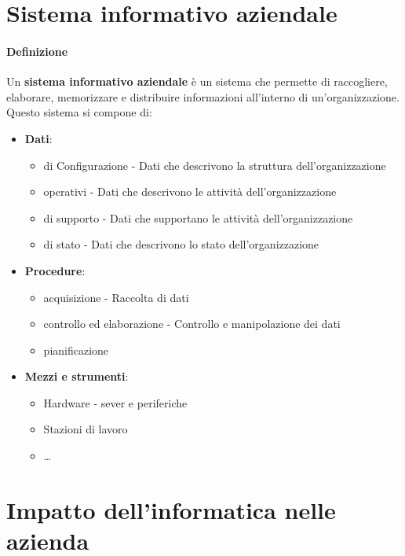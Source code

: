 \section{Sistema informativo aziendale}
    \paragraph{Definizione} Un \textbf{sistema informativo aziendale} è un sistema che permette di raccogliere, elaborare, memorizzare e distribuire informazioni all'interno di un'organizzazione. Questo sistema si compone di:
    \begin{itemize}
        \item \textbf{Dati}: \begin{itemize}
            \item di Configurazione - Dati che descrivono la struttura dell'organizzazione
            \item operativi - Dati che descrivono le attività dell'organizzazione
            \item di supporto - Dati che supportano le attività dell'organizzazione
            \item di stato - Dati che descrivono lo stato dell'organizzazione
        \end{itemize}
        \item \textbf{Procedure}: \begin{itemize}
            \item acquisizione - Raccolta di dati
            \item controllo ed elaborazione - Controllo e manipolazione dei dati
            \item pianificazione
        \end{itemize}
        \item \textbf{Mezzi e strumenti}: \begin{itemize}
            \item Hardware - sever e periferiche
            \item Stazioni di lavoro
            \item \dots
        \end{itemize}
    \end{itemize}
\section{Impatto dell'informatica nelle azienda}
